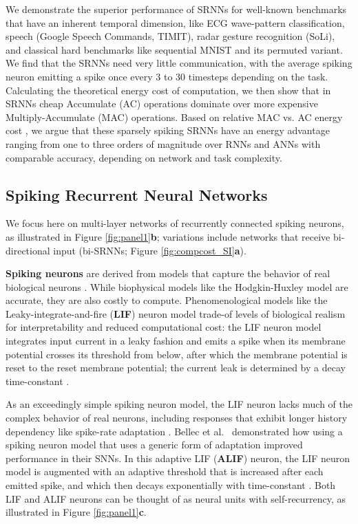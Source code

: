 \documentclass[fleqn,10pt]{wlscirep}
\begin{document}
We demonstrate the superior performance of SRNNs for well-known benchmarks that have an inherent temporal dimension, like ECG wave-pattern classification, speech (Google Speech Commands, TIMIT), radar gesture recognition (SoLi), and classical hard benchmarks like sequential MNIST and its permuted variant. We find that the SRNNs need very little communication, with the average spiking neuron emitting a spike once every 3 to 30 timesteps depending on the task. Calculating the theoretical energy cost of computation, we then show that in SRNNs cheap Accumulate (AC) operations dominate over more expensive Multiply-Accumulate (MAC) operations. Based on relative MAC vs. AC energy cost \cite{roy2019towards,Sengupta2019-tg}, we argue that these sparsely spiking SRNNs have an energy advantage ranging from one to three orders of magnitude over RNNs and ANNs with comparable accuracy, depending on network and task complexity. 









\subsection*{Spiking Recurrent Neural Networks}
We focus here on multi-layer networks of recurrently connected spiking neurons, as illustrated in Figure \ref{fig:panel1}\textbf{b}; variations include networks that receive bi-directional input (bi-SRNNs; Figure \ref{fig:compcost_SI}\textbf{a}).


{\bf Spiking neurons} are derived from models that capture the behavior of real biological neurons \cite{gerstner2002spiking}. While biophysical models like the Hodgkin-Huxley model are accurate, they are also costly to compute\cite{izhikevich2003simple}. Phenomenological models like the Leaky-integrate-and-fire ({\bf LIF}) neuron model trade-of levels of biological realism for interpretability and reduced computational cost: the LIF neuron model integrates input current in a leaky fashion and emits a spike when its membrane potential crosses its threshold from below, after which the membrane potential is reset to the reset membrane potential; the current leak is determined by a decay time-constant . 

As an exceedingly simple spiking neuron model, the LIF neuron lacks much of the complex behavior of real neurons, including responses that exhibit longer history dependency like spike-rate adaptation \cite{izhikevich2003simple}. Bellec et al.~\cite{bellec2018long} demonstrated how using a spiking neuron model that uses a generic form of adaptation improved performance in their SNNs. In this adaptive LIF ({\bf ALIF}) neuron, the LIF neuron model is augmented with an adaptive threshold that is increased after each emitted spike, and which then decays exponentially with time-constant . Both LIF and ALIF neurons can be thought of as neural units with self-recurrency, as illustrated in Figure \ref{fig:panel1}\textbf{c}.
\end{document}
